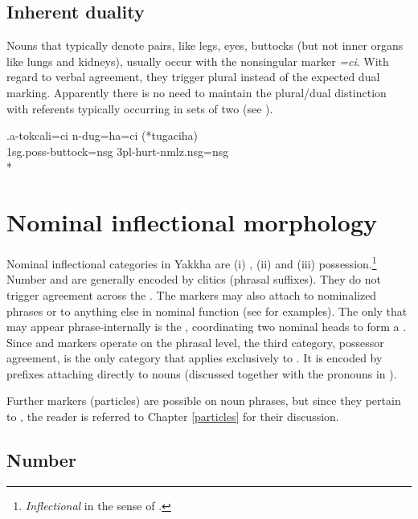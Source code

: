 \subsection{Inherent duality}\label{lex-noun-5}

Nouns that typically denote pairs, like legs, eyes, buttocks (but not inner organs like lungs and kidneys), usually occur with the nonsingular marker \emph{=ci}. With regard to verbal agreement, they trigger plural instead of the expected dual marking. Apparently there is no need to maintain the plural/dual distinction with referents typically occurring in sets of two (see \Next). 

\exg.a-tokcali=ci n-dug=ha=ci (*tugaciha)\\
{\sc 1sg.poss-}buttock{\sc =nsg} {\sc 3pl-}hurt{\sc -nmlz.nsg=nsg}\\*
 
\section{Nominal  inflectional morphology}\label{nom-morph}

Nominal inflectional categories in Yakkha are (i) , (ii)  and (iii) possession.\footnote{\emph{Inflectional} in the sense of  \citep{Bickeletal2007Inflectional}.} Number and  are generally encoded by clitics (phrasal suffixes). They do not trigger agreement across the . The  markers may also attach to nominalized phrases or to anything else in nominal function (see  for examples). The only  that may appear phrase-internally is the  , coordinating two nominal heads to form a . Since  and  markers operate on the phrasal level, the third category, possessor agreement, is the only category that applies exclusively to . It is encoded by prefixes attaching directly to nouns (discussed together with the pronouns in ). 

Further markers (particles) are  possible on noun phrases, but since they pertain to , the reader is referred to Chapter \ref{particles} for their discussion.

\subsection{Number}\label{number}

